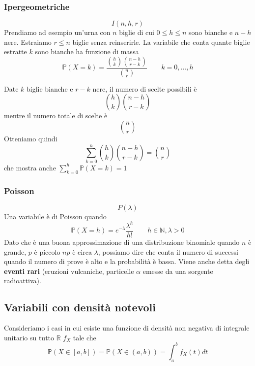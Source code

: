 \subsubsection{Ipergeometriche}
\begin{equation}
	I(n,h,r)
\end{equation}
Prendiamo ad esempio un'urna con $n$ biglie di cui $0 \leq h \leq n$ sono bianche e $n-h$ nere. Estraiamo $r \leq n$ biglie senza reinserirle. La variabile che conta quante biglie estratte $k$ sono bianche ha funzione di massa
\begin{equation}
	\mathbb{P}(X=k) = \frac{\binom{h}{k}\binom{n-h}{r-k}}{\binom{n}{r}} \quad\quad k=0,\ldots, h
\end{equation}
\begin{proposition}
	Date $k$ biglie bianche e $r-k$ nere, il numero di scelte possibili è
	\begin{equation*}
		\binom{h}{k}\binom{n-h}{r-k}
	\end{equation*}
	mentre il numero totale di scelte è 
	\begin{equation*}
		\binom{n}{r}
	\end{equation*}
	Otteniamo quindi
	\begin{equation}
		\sum_{k=0}^{h} \binom{h}{k}\binom{n-h}{r-k} = \binom{n}{r}
	\end{equation}
	che mostra anche $\sum_{k=0}^{h}\mathbb{P}(X=k) = 1$
\end{proposition}

\subsubsection{Poisson}
\begin{equation}
	P(\lambda)
\end{equation}
Una variabile è di Poisson quando
\begin{equation}
	\mathbb{P}(X=h)=e^{-\lambda}\frac{\lambda^h}{h!} \quad\quad h \in \mathbb{N}, \lambda>0
\end{equation}
Dato che è una buona approssimazione di una distribuzione binomiale quando $n$ è grande, $p$ è piccolo $np$ è circa $\lambda$, possiamo dire che conta il numero di successi quando il numero di prove è alto e la probabilità è bassa. Viene anche detta degli \textbf{eventi rari} (eruzioni vulcaniche, particelle $\alpha$ emesse da una sorgente radioattiva).

\subsection{Variabili con densità notevoli}
Consideriamo i casi in cui esiste una funzione di densità non negativa di integrale unitario su tutto $\mathbb{R}$ $f_X$ tale che
\begin{equation}
	\mathbb{P}(X \in [a,b]) = \mathbb{P}(X \in (a,b)) = \int_{a}^{b} f_X(t)dt
\end{equation}

